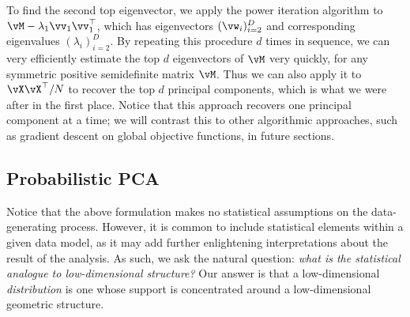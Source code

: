 \documentclass[\toplevelprefix/book-main.tex]{subfiles}
\begin{document}

To find the second top eigenvector, we apply the power iteration algorithm to \(\vM - \lambda_{1}\vv_{1}\vv_{1}^{\top}\), which has eigenvectors \((\vw_{i})_{i = 2}^{D}\) and corresponding eigenvalues \((\lambda_{i})_{i = 2}^{D}\). By repeating this procedure \(d\) times in sequence, we can very efficiently estimate the top \(d\) eigenvectors of \(\vM\) very quickly, for any symmetric positive semidefinite matrix \(\vM\). Thus we can also apply it to \(\vX\vX^{\top}/N\) to recover the top \(d\) principal components, which is what we were after in the first place. Notice that this approach recovers one principal component at a time; we will contrast this to other algorithmic approaches, such as gradient descent on global objective functions, in future sections.





\subsection{Probabilistic PCA}\label{subsec:probabilistic PCA}

Notice that the above formulation makes no statistical assumptions on the
data-generating process. However, it is common to include statistical elements
within a given data model, as it may add further enlightening interpretations
about the result of the analysis. As such, we ask the natural question:
\textit{what is the statistical analogue to low-dimensional structure?} Our answer is that a low-dimensional \textit{distribution} is one whose support is concentrated around a low-dimensional geometric structure. 
\end{document}
